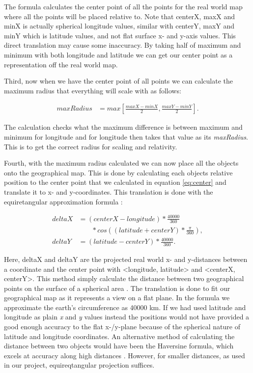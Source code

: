 The formula calculates the center point of all the points for the real world map where all the points will be placed relative to. Note that centerX, maxX and minX is actually spherical longitude values, similar with centerY, maxY and minY which is latitude values, and not flat surface x- and y-axis values. This direct translation may cause some inaccuracy. By taking half of maximum and minimum with both longitude and latitude we can get our center point as a representation off the real world map.
 
Third, now when we have the center point of all points we can calculate the maximum radius that everything will scale with as follows:

\begin{align}
\label{eq:radius}
maxRadius &= max[\frac{maxX-minX}{2}, \frac{maxY-minY}{2}].
\end{align}

The calculation checks what the maximum difference is between maximum and minimum for longitude and for longitude then takes that value as its \textit{maxRadius}. This is to get the correct radius for scaling and relativity.

Fourth, with the maximum radius calculated we can now place all the objects onto the geographical map. This is done by calculating each objects relative position to the center point that we calculated in equation \ref{eq:center} and translate it to x- and y-coordinates. This translation is done with the equiretangular approximation formula \cite{equi}:

\begin{align}
\label{eq:equiretangular}
deltaX &= (centerX-longitude)*\frac{40000}{360}  \\
 &\phantom{b=\,} *cos((latitude+centerY) * \frac{\pi}{360}), \nonumber\\
deltaY &= (latitude-centerY)*\frac{40000}{360}. \nonumber
\end{align}

Here, deltaX and deltaY are the projected real world x- and y-distances between a coordinate and the center point with <longitude, latitude> and <centerX, centerY>. This method simply calculate the distance between two geographical points on the surface of a spherical area \cite{equi}. The translation is done to fit our geographical map as it represents a view on a flat plane. In the formula we approximate the earth's circumference as 40000 km. If we had used latitude and longitude as plain \textit{x} and \textit{y} values instead the positions would not have provided a good enough accuracy to the flat x-/y-plane because of the spherical nature of latitude and longitude coordinates. An alternative method of calculating the distance between two objects would have been the Haversine formula, which excels at accuracy along high distances \cite{haversine}. However, for smaller distances, as used in our project, equireqtangular projection suffices.

